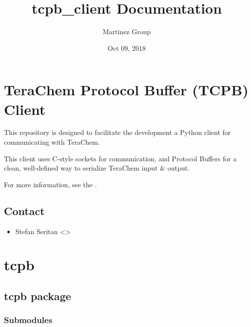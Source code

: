 \documentclass[letterpaper,10pt,english]{sphinxmanual}
\title{tcpb\_client Documentation}
\date{Oct 09, 2018}
\author{Martinez Group}
\begin{document}
\maketitle
\sphinxtableofcontents
{}\label{\detokenize{index::doc}}



\chapter{TeraChem Protocol Buffer (TCPB) Client}
\label{\detokenize{readme:welcome-to-tcpb-client-s-documentation}}\label{\detokenize{readme::doc}}\label{\detokenize{readme:terachem-protocol-buffer-tcpb-client}}
This repository is designed to facilitate the development a Python client for communicating with TeraChem.

This client uses C-style sockets for communication, and Protocol Buffers for a clean, well-defined way to serialize TeraChem input \& output.

For more information, see the .


\section{Contact}
\label{\detokenize{readme:wiki}}\label{\detokenize{readme:contact}}\begin{itemize}
\item {} 
Stefan Seritan \textless{}\textgreater{}

\end{itemize}


\chapter{tcpb}
\label{\detokenize{modules:tcpb}}\label{\detokenize{modules::doc}}

\section{tcpb package}
\label{\detokenize{tcpb::doc}}\label{\detokenize{tcpb:tcpb-package}}

\subsection{Submodules}
\label{\detokenize{tcpb:submodules}}
\end{document}
